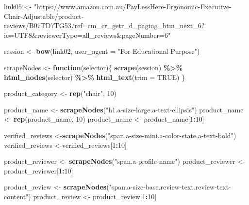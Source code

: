 \documentclass[
]{article}
\newenvironment{Shaded}{\begin{snugshade}}{\end{snugshade}}
\newcommand{\AttributeTok}[1]{\textcolor[rgb]{0.13,0.29,0.53}{#1}}
\newcommand{\ConstantTok}[1]{\textcolor[rgb]{0.56,0.35,0.01}{#1}}
\newcommand{\ControlFlowTok}[1]{\textcolor[rgb]{0.13,0.29,0.53}{\textbf{#1}}}
\newcommand{\DecValTok}[1]{\textcolor[rgb]{0.00,0.00,0.81}{#1}}
\newcommand{\FunctionTok}[1]{\textcolor[rgb]{0.13,0.29,0.53}{\textbf{#1}}}
\newcommand{\NormalTok}[1]{#1}
\newcommand{\OtherTok}[1]{\textcolor[rgb]{0.56,0.35,0.01}{#1}}
\newcommand{\SpecialCharTok}[1]{\textcolor[rgb]{0.81,0.36,0.00}{\textbf{#1}}}
\newcommand{\StringTok}[1]{\textcolor[rgb]{0.31,0.60,0.02}{#1}}
\begin{document}
\begin{Shaded}
\begin{Highlighting}[]
\NormalTok{link05 }\OtherTok{\textless{}{-}} \StringTok{"https://www.amazon.com.au/PayLessHere{-}Ergonomic{-}Executive{-}Chair{-}Adjustable/product{-}reviews/B07TD7TG53/ref=cm\_cr\_getr\_d\_paging\_btm\_next\_6?ie=UTF8\&reviewerType=all\_reviews\&pageNumber=6"}


\NormalTok{  session }\OtherTok{\textless{}{-}} \FunctionTok{bow}\NormalTok{(link02,}
               \AttributeTok{user\_agent =} \StringTok{"For Educational Purpose"}\NormalTok{)}

\NormalTok{  scrapeNodes }\OtherTok{\textless{}{-}} \ControlFlowTok{function}\NormalTok{(selector)\{}
    \FunctionTok{scrape}\NormalTok{(session) }\SpecialCharTok{\%\textgreater{}\%}
      \FunctionTok{html\_nodes}\NormalTok{(selector) }\SpecialCharTok{\%\textgreater{}\%}
      \FunctionTok{html\_text}\NormalTok{(}\AttributeTok{trim =} \ConstantTok{TRUE}\NormalTok{)}
\NormalTok{  \}}

\NormalTok{  product\_category }\OtherTok{\textless{}{-}} \FunctionTok{rep}\NormalTok{(}\StringTok{"chair"}\NormalTok{, }\DecValTok{10}\NormalTok{)}

\NormalTok{  product\_name }\OtherTok{\textless{}{-}} \FunctionTok{scrapeNodes}\NormalTok{(}\StringTok{"h1.a{-}size{-}large.a{-}text{-}ellipsis"}\NormalTok{)}
\NormalTok{  product\_name }\OtherTok{\textless{}{-}} \FunctionTok{rep}\NormalTok{(product\_name, }\DecValTok{10}\NormalTok{)}
\NormalTok{  product\_name }\OtherTok{\textless{}{-}}\NormalTok{ product\_name[}\DecValTok{1}\SpecialCharTok{:}\DecValTok{10}\NormalTok{]}
  
\NormalTok{  verified\_reviews }\OtherTok{\textless{}{-}}\FunctionTok{scrapeNodes}\NormalTok{(}\StringTok{"span.a{-}size{-}mini.a{-}color{-}state.a{-}text{-}bold"}\NormalTok{)}
\NormalTok{  verified\_reviews }\OtherTok{\textless{}{-}}\NormalTok{verified\_reviews[}\DecValTok{1}\SpecialCharTok{:}\DecValTok{10}\NormalTok{]}
  
\NormalTok{  product\_reviewer }\OtherTok{\textless{}{-}} \FunctionTok{scrapeNodes}\NormalTok{(}\StringTok{"span.a{-}profile{-}name"}\NormalTok{)}
\NormalTok{  product\_reviewer }\OtherTok{\textless{}{-}}\NormalTok{ product\_reviewer[}\DecValTok{1}\SpecialCharTok{:}\DecValTok{10}\NormalTok{]}
  
\NormalTok{  product\_review }\OtherTok{\textless{}{-}} \FunctionTok{scrapeNodes}\NormalTok{(}\StringTok{"span.a{-}size{-}base.review{-}text.review{-}text{-}content"}\NormalTok{)}
\NormalTok{  product\_review }\OtherTok{\textless{}{-}}\NormalTok{ product\_review[}\DecValTok{1}\SpecialCharTok{:}\DecValTok{10}\NormalTok{]}
  

\end{Highlighting}
\end{Shaded}
\end{document}
